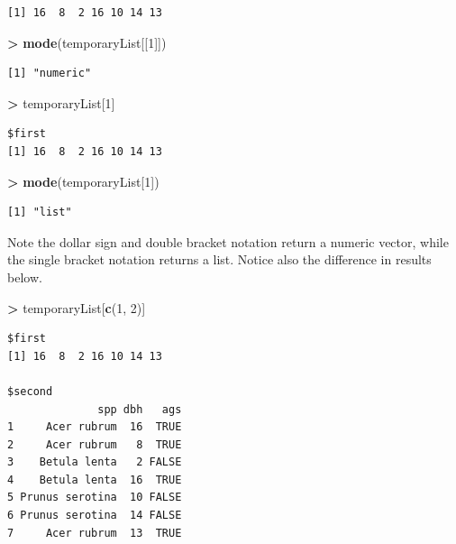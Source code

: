 \documentclass[]{krantz}
\makeatletter
\newenvironment{Shaded}{\begin{snugshade}}{\end{snugshade}}
\newcommand{\KeywordTok}[1]{\textcolor[rgb]{0.27,0.27,0.27}{\textbf{#1}}}
\newcommand{\DecValTok}[1]{\textcolor[rgb]{0.06,0.06,0.06}{#1}}
\newcommand{\StringTok}[1]{\textcolor[rgb]{0.5,0.5,0.5}{#1}}
\newcommand{\OperatorTok}[1]{\textcolor[rgb]{0.43,0.43,0.43}{\textbf{#1}}}
\newcommand{\NormalTok}[1]{#1}
\newenvironment{kframe}{%
\medskip{}
\setlength{\fboxsep}{.8em}
 \def\at@end@of@kframe{}%
 \ifinner\ifhmode%
  \def\at@end@of@kframe{\end{minipage}}%
  \begin{minipage}{\columnwidth}%
 \fi\fi%
 \def\FrameCommand##1{\hskip\@totalleftmargin \hskip-\fboxsep
 \colorbox{shadecolor}{##1}\hskip-\fboxsep
     \hskip-\linewidth \hskip-\@totalleftmargin \hskip\columnwidth}%
 \MakeFramed {\advance\hsize-\width
   \@totalleftmargin\z@ \linewidth\hsize
   \@setminipage}}%
 {\par\unskip\endMakeFramed%
 \at@end@of@kframe}
\renewenvironment{Shaded}{\begin{kframe}}{\end{kframe}}
\theoremstyle{definition}
\theoremstyle{definition}
\theoremstyle{definition}
\theoremstyle{remark}
\makeatother
\begin{document}
\begin{verbatim}
[1] 16  8  2 16 10 14 13
\end{verbatim}

\begin{Shaded}
\begin{Highlighting}[]
\OperatorTok{>}\StringTok{ }\KeywordTok{mode}\NormalTok{(temporaryList[[}\DecValTok{1}\NormalTok{]])}
\end{Highlighting}
\end{Shaded}

\begin{verbatim}
[1] "numeric"
\end{verbatim}

\begin{Shaded}
\begin{Highlighting}[]
\OperatorTok{>}\StringTok{ }\NormalTok{temporaryList[}\DecValTok{1}\NormalTok{]}
\end{Highlighting}
\end{Shaded}

\begin{verbatim}
$first
[1] 16  8  2 16 10 14 13
\end{verbatim}

\begin{Shaded}
\begin{Highlighting}[]
\OperatorTok{>}\StringTok{ }\KeywordTok{mode}\NormalTok{(temporaryList[}\DecValTok{1}\NormalTok{])}
\end{Highlighting}
\end{Shaded}

\begin{verbatim}
[1] "list"
\end{verbatim}

Note the dollar sign and double bracket notation return a numeric
vector, while the single bracket notation returns a list. Notice also
the difference in results below.

\begin{Shaded}
\begin{Highlighting}[]
\OperatorTok{>}\StringTok{ }\NormalTok{temporaryList[}\KeywordTok{c}\NormalTok{(}\DecValTok{1}\NormalTok{, }\DecValTok{2}\NormalTok{)]}
\end{Highlighting}
\end{Shaded}

\begin{verbatim}
$first
[1] 16  8  2 16 10 14 13

$second
              spp dbh   ags
1     Acer rubrum  16  TRUE
2     Acer rubrum   8  TRUE
3    Betula lenta   2 FALSE
4    Betula lenta  16  TRUE
5 Prunus serotina  10 FALSE
6 Prunus serotina  14 FALSE
7     Acer rubrum  13  TRUE
\end{verbatim}
\end{document}
